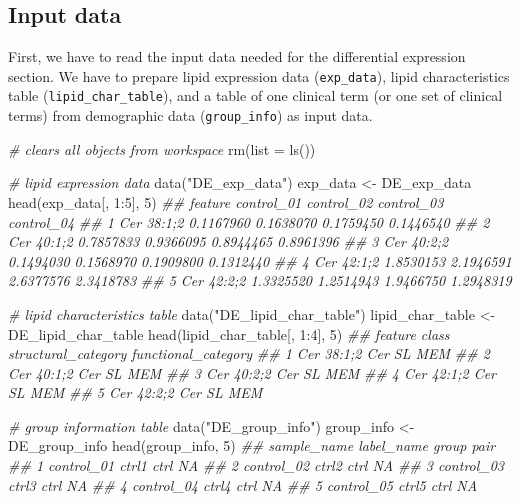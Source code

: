 \documentclass[]{article}
\newcommand{\hlnum}[1]{\textcolor[rgb]{0.816,0.125,0.439}{#1}}%
\newcommand{\hlstr}[1]{\textcolor[rgb]{0.251,0.627,0.251}{#1}}%
\newcommand{\hlcom}[1]{\textcolor[rgb]{0.502,0.502,0.502}{\textit{#1}}}%
\newcommand{\hlopt}[1]{\textcolor[rgb]{0,0,0}{#1}}%
\newcommand{\hlstd}[1]{\textcolor[rgb]{0.251,0.251,0.251}{#1}}%
\newcommand{\hlkwc}[1]{\textcolor[rgb]{0.251,0.251,0.251}{#1}}%
\newcommand{\hlkwd}[1]{\textcolor[rgb]{0.878,0.439,0.125}{#1}}%
\newenvironment{Shaded}{\begin{myshaded}}{\end{myshaded}}
\newcommand{\KeywordTok}[1]{\hlkwd{#1}}
\newcommand{\DataTypeTok}[1]{\hlkwc{#1}}
\newcommand{\DecValTok}[1]{\hlnum{#1}}
\newcommand{\StringTok}[1]{\hlstr{#1}}
\newcommand{\CommentTok}[1]{\hlcom{#1}}
\newcommand{\OperatorTok}[1]{\hlopt{#1}}
\newcommand{\NormalTok}[1]{\hlstd{#1}}
\begin{document}
\hypertarget{input-data-1}{%
\subsection{Input data}\label{input-data-1}}

First, we have to read the input data needed for the differential expression section. We have to prepare lipid expression data (\texttt{exp\_data}), lipid characteristics table (\texttt{lipid\_char\_table}), and a table of one clinical term (or one set of clinical terms) from demographic data (\texttt{group\_info}) as input data.

\begin{Shaded}
\begin{Highlighting}[]
\CommentTok{# clears all objects from workspace}
\KeywordTok{rm}\NormalTok{(}\DataTypeTok{list =} \KeywordTok{ls}\NormalTok{())}

\CommentTok{# lipid expression data}
\KeywordTok{data}\NormalTok{(}\StringTok{"DE_exp_data"}\NormalTok{)}
\NormalTok{exp_data <-}\StringTok{ }\NormalTok{DE_exp_data}
\KeywordTok{head}\NormalTok{(exp_data[, }\DecValTok{1}\OperatorTok{:}\DecValTok{5}\NormalTok{], }\DecValTok{5}\NormalTok{)}
\CommentTok{##      feature control_01 control_02 control_03 control_04}
\CommentTok{## 1 Cer 38:1;2  0.1167960  0.1638070  0.1759450  0.1446540}
\CommentTok{## 2 Cer 40:1;2  0.7857833  0.9366095  0.8944465  0.8961396}
\CommentTok{## 3 Cer 40:2;2  0.1494030  0.1568970  0.1909800  0.1312440}
\CommentTok{## 4 Cer 42:1;2  1.8530153  2.1946591  2.6377576  2.3418783}
\CommentTok{## 5 Cer 42:2;2  1.3325520  1.2514943  1.9466750  1.2948319}

\CommentTok{# lipid characteristics table}
\KeywordTok{data}\NormalTok{(}\StringTok{"DE_lipid_char_table"}\NormalTok{)}
\NormalTok{lipid_char_table <-}\StringTok{ }\NormalTok{DE_lipid_char_table}
\KeywordTok{head}\NormalTok{(lipid_char_table[, }\DecValTok{1}\OperatorTok{:}\DecValTok{4}\NormalTok{], }\DecValTok{5}\NormalTok{)}
\CommentTok{##      feature class structural_category functional_category}
\CommentTok{## 1 Cer 38:1;2   Cer                  SL                 MEM}
\CommentTok{## 2 Cer 40:1;2   Cer                  SL                 MEM}
\CommentTok{## 3 Cer 40:2;2   Cer                  SL                 MEM}
\CommentTok{## 4 Cer 42:1;2   Cer                  SL                 MEM}
\CommentTok{## 5 Cer 42:2;2   Cer                  SL                 MEM}

\CommentTok{# group information table}
\KeywordTok{data}\NormalTok{(}\StringTok{"DE_group_info"}\NormalTok{)}
\NormalTok{group_info <-}\StringTok{ }\NormalTok{DE_group_info}
\KeywordTok{head}\NormalTok{(group_info, }\DecValTok{5}\NormalTok{)}
\CommentTok{##   sample_name label_name group pair}
\CommentTok{## 1  control_01      ctrl1  ctrl   NA}
\CommentTok{## 2  control_02      ctrl2  ctrl   NA}
\CommentTok{## 3  control_03      ctrl3  ctrl   NA}
\CommentTok{## 4  control_04      ctrl4  ctrl   NA}
\CommentTok{## 5  control_05      ctrl5  ctrl   NA}
\end{Highlighting}
\end{Shaded}
\end{document}
